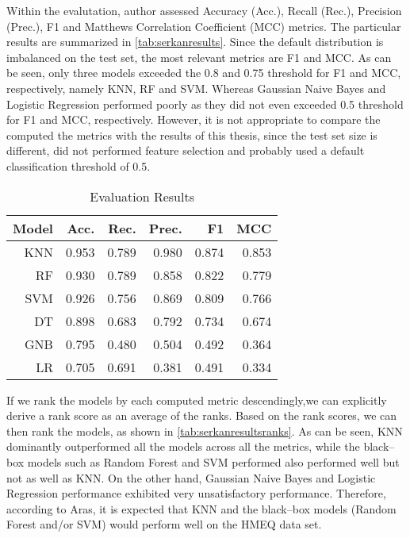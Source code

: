 Within the evalutation, author assessed Accuracy (Acc.), Recall (Rec.), Precision (Prec.), F1 and Matthews Correlation Coefficient (MCC) metrics. The particular results are summarized in \autoref{tab:serkanresults}.
Since the default distribution is imbalanced on the test set, the most relevant metrics are F1 and MCC.
As can be seen, only three models exceeded the 0.8 and 0.75 threshold for F1 and MCC, respectively, namely KNN, RF and SVM. Whereas Gaussian Naive Bayes and Logistic Regression performed poorly as they did not even exceeded 0.5 threshold for F1 and MCC, respectively.
However, it is not appropriate to compare the computed the metrics with the results of this thesis, since the test set size is different, did not performed feature selection and probably used a default classification threshold of 0.5.
\begin{table}[H]
    \small
    \setlength{\tabcolsep}{8pt}
    \renewcommand{\arraystretch}{1.3}
    \centering
    \caption[Evaluation Results \citep{serkan2021bagging}]{Evaluation Results \citep{serkan2021bagging}}\label{tab:serkanresults}
    \begin{tabular}{r r r r r r}
    \toprule
    Model & Acc. & Rec. & Prec. & F1 & MCC \\
    \midrule
    \hline
	
	KNN & 0.953 & 0.789 & 0.980 & 0.874 & 0.853 \\
    RF & 0.930 & 0.789 & 0.858 & 0.822 & 0.779 \\
    SVM & 0.926 & 0.756 & 0.869 & 0.809 & 0.766 \\
    DT & 0.898 & 0.683 & 0.792 & 0.734 & 0.674 \\
    GNB & 0.795 & 0.480 & 0.504 & 0.492 & 0.364 \\
	LR & 0.705 & 0.691 & 0.381 & 0.491 & 0.334 \\
	
    \hline
    \bottomrule
    \end{tabular}
    \vspace{0.35em}
    
    \vspace{-1em}
\end{table}

If we rank the models by each computed metric descendingly,we can explicitly derive a rank score as an average of the ranks. Based on the rank scores, we can then rank the models, as shown in \autoref{tab:serkanresultsranks}. As can be seen, KNN dominantly outperformed all the models across all the metrics, while the black--box models such as Random Forest and SVM performed also performed well but not as well as KNN.
On the other hand, Gaussian Naive Bayes and Logistic Regression performance exhibited very unsatisfactory performance.
Therefore, according to Aras, it is expected that KNN and the black--box models (Random Forest and/or SVM) would perform well on the HMEQ data set.

